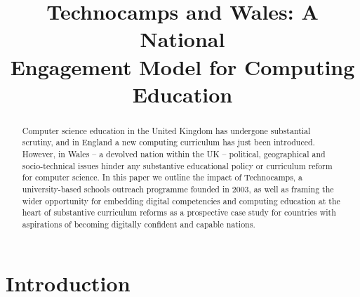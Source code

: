 \documentclass[conference]{IEEEtran}
\begin{document}
%
\title{Technocamps and Wales: A National \\ 
       Engagement Model for Computing Education}


\author{
\and
{}
}





\maketitle

\begin{abstract}
Computer science education in the United Kingdom has undergone
substantial scrutiny, and in England a new computing curriculum has
just been introduced.  However, in Wales -- a devolved nation within
the UK -- political, geographical and socio-technical issues hinder
any substantive educational policy or curriculum reform for computer
science.  In this paper we outline the impact of Technocamps, a
university-based schools outreach programme founded in 2003, as well
as framing the wider opportunity for embedding digital competencies
and computing education at the heart of substantive curriculum reforms
as a prospective case study for countries with aspirations of becoming
digitally confident and capable nations.
\end{abstract}


\section{Introduction}\label{intro}

\end{document}
